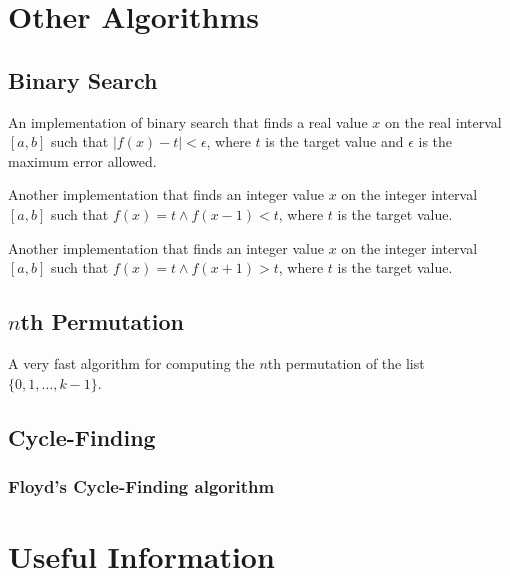 \documentclass[11pt,a4paper,titlepage]{article}
\begin{document}
	\section{Other Algorithms}
		\subsection{Binary Search}
			An implementation of binary search that finds a real value $x$ on the real interval $[a,b]$ such that $|f(x) - t| < \epsilon$, where $t$ is the target value and $\epsilon$ is the maximum error allowed.
			

			Another implementation that finds an integer value $x$ on the integer interval $[a,b]$ such that $f(x) = t \land f(x - 1) < t$, where $t$ is the target value.
			

			Another implementation that finds an integer value $x$ on the integer interval $[a,b]$ such that $f(x) = t \land f(x + 1) > t$, where $t$ is the target value.
			

		\subsection{$n$th Permutation}
			A very fast algorithm for computing the $n$th permutation of the list $\{0,1,\ldots,k-1\}$.
			

		\subsection{Cycle-Finding}
			\subsubsection{Floyd's Cycle-Finding algorithm}
				

	\section{Useful Information}
\end{document}
